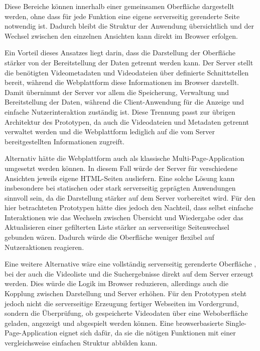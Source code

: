 Diese Bereiche können innerhalb einer gemeinsamen Oberfläche dargestellt werden, ohne dass für jede Funktion eine eigene serverseitig gerenderte Seite notwendig ist. Dadurch bleibt die Struktur der Anwendung übersichtlich und der Wechsel zwischen den einzelnen Ansichten kann direkt im Browser erfolgen. 

Ein Vorteil dieses Ansatzes liegt darin, dass die Darstellung der Oberfläche stärker von der Bereitstellung der Daten getrennt werden kann. Der Server stellt die benötigten Videometadaten und Videodateien über definierte Schnittstellen bereit, während die Webplattform diese Informationen im Browser darstellt. 
Damit übernimmt der Server vor allem die Speicherung, Verwaltung und Bereitstellung der Daten, während die Client-Anwendung für die Anzeige und einfache Nutzerinteraktion zuständig ist. Diese Trennung passt zur übrigen Architektur des Prototypen, 
da auch die Videodateien und Metadaten getrennt verwaltet werden und die Webplattform lediglich auf die vom Server bereitgestellten Informationen zugreift. 

Alternativ hätte die Webplattform auch als klassische Multi-Page-Application umgesetzt werden können. In diesem Fall würde der Server für verschiedene Ansichten jeweils eigene HTML-Seiten ausliefern. 
Eine solche Lösung kann insbesondere bei statischen oder stark serverseitig geprägten Anwendungen sinnvoll sein, da die Darstellung stärker auf dem Server vorbereitet wird. Für den hier betrachteten Prototypen hätte dies jedoch den Nachteil, 
dass selbst einfache Interaktionen wie das Wechseln zwischen Übersicht und Wiedergabe oder das Aktualisieren einer gefilterten Liste stärker an serverseitige Seitenwechsel gebunden wären. Dadurch würde die Oberfläche weniger flexibel auf Nutzeraktionen reagieren. 

Eine weitere Alternative wäre eine vollständig serverseitig gerenderte Oberfläche \cite{osmani_miller_rendering_2026}, bei der auch die Videoliste und die Suchergebnisse direkt auf dem Server erzeugt werden. Dies würde die Logik im Browser reduzieren, allerdings auch die Kopplung zwischen Darstellung und Server erhöhen. 
Für den Prototypen steht jedoch nicht die serverseitige Erzeugung fertiger Webseiten im Vordergrund, sondern die Überprüfung, ob gespeicherte Videodaten über eine Weboberfläche geladen, angezeigt und abgespielt werden können. Eine browserbasierte Single-Page-Application eignet sich dafür, 
da sie die nötigen Funktionen mit einer vergleichsweise einfachen Struktur abbilden kann. 

